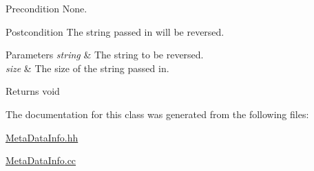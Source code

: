 \begin{DoxyPrecond}{Precondition}
None. 
\end{DoxyPrecond}
\begin{DoxyPostcond}{Postcondition}
The string passed in will be reversed. 
\end{DoxyPostcond}

\begin{DoxyParams}{Parameters}
{\em string} & The string to be reversed. \\
\hline
{\em size} & The size of the string passed in. \\
\hline
\end{DoxyParams}
\begin{DoxyReturn}{Returns}
void 
\end{DoxyReturn}


The documentation for this class was generated from the following files\-:\begin{DoxyCompactItemize}
\item 
\hyperlink{_meta_data_info_8hh}{Meta\-Data\-Info.\-hh}\item 
\hyperlink{_meta_data_info_8cc}{Meta\-Data\-Info.\-cc}\end{DoxyCompactItemize}

